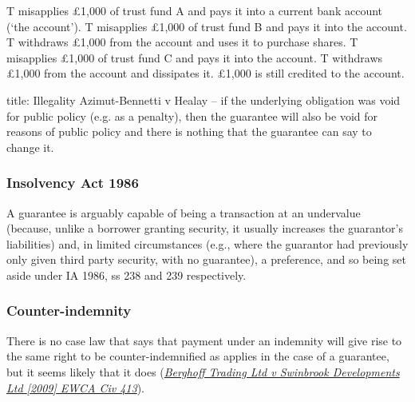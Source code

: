 \documentclass[
]{article}
\newenvironment{Shaded}{}{}
\newcommand{\NormalTok}[1]{#1}
\begin{document}
\begin{Shaded}
\begin{Highlighting}[]
\NormalTok{T misapplies £1,000 of trust fund A and pays it into a current bank account (‘the account’). T misapplies £1,000 of trust fund B and pays it into the account. T withdraws £1,000 from the account and uses it to purchase shares. T misapplies £1,000 of trust fund C and pays it into the account. T withdraws £1,000 from the account and dissipates it. £1,000 is still credited to the account.}
\end{Highlighting}
\end{Shaded}

\begin{Shaded}
\begin{Highlighting}[]
\NormalTok{title: Illegality}
\NormalTok{Azimut{-}Bennetti v Healay – if the underlying obligation was void for public policy (e.g. as a penalty), then the guarantee will also be void for reasons of public policy and there is nothing that the guarantee can say to change it.}
\end{Highlighting}
\end{Shaded}

\hypertarget{insolvency-act-1986}{%
\subsubsection{Insolvency Act 1986}\label{insolvency-act-1986}}

A guarantee is arguably capable of being a transaction at an undervalue
(because, unlike a borrower granting security, it usually increases the
guarantor's liabilities) and, in limited circumstances (e.g., where the
guarantor had previously only given third party security, with no
guarantee), a preference, and so being set aside under IA 1986, ss 238
and 239 respectively.

\hypertarget{counter-indemnity}{%
\subsubsection{Counter-indemnity}\label{counter-indemnity}}

There is no case law that says that payment under an indemnity will give
rise to the same right to be counter-indemnified as applies in the case
of a guarantee, but it seems likely that it does
(\emph{\href{https://uk.westlaw.com/D-009-8767?originationContext=document\&transitionType=PLDocumentLink\&contextData=(sc.Default)\&ppcid=9fc18fbc2d79468f9bd5272f7e22e9db}{Berghoff
Trading Ltd v Swinbrook Developments Ltd {[}2009{]} EWCA Civ 413}}).
\end{document}
